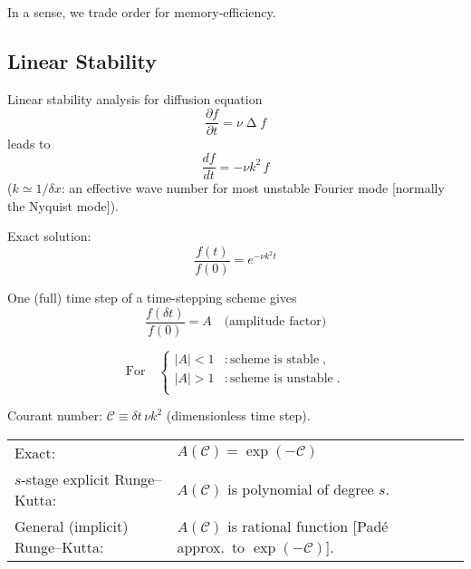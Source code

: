 \documentclass[\mydriver,12pt,twoside,notitlepage]{article}
\newcommand{\Black}{\color{black}}
\newcommand{\ColEmph}[1]{{\color{DarkishRed}#1}}
\newcommand{\colEmph}[1]{{\color{DarkishBlue}#1}}
\newcommand{\Courant} {\mathcal{C}}
\newcommand{\Laplace} { \mathop{\Delta}\nolimits}
\begin{document}
\bigskip

In a sense, we trade order for memory-efficiency.

\subsection{Linear Stability}

\ColEmph{Linear stability analysis} for \colEmph{diffusion equation}
\begin{equation}
  \dfrac{\partial f}{\partial t}
  = \nu \Laplace f
\end{equation}
leads to
\begin{equation}
  \dfrac{df}{dt} = - \nu k^2 \,f
\end{equation}
($k \simeq 1/\delta x$: an effective wave number for most
unstable Fourier mode [normally the Nyquist mode]).

Exact solution:
\begin{equation}
  \dfrac{f(t)}{f(0)} = e^{-\nu k^2 t}
\end{equation}

One (full) time step of a time-stepping scheme gives
\begin{equation}
  \dfrac{f(\delta t)}{f(0)} = A
  \quad\text{(amplitude factor)}
\end{equation}

\begin{equation*}
  \text{For} \quad
  \begin{cases}
    |A| < 1 &: \text{scheme is stable} \; , \\
    |A| > 1 &: \text{scheme is unstable} \; . \\
  \end{cases}
\end{equation*}

\clearpage

Courant number: $\Courant \equiv \delta t \, \nu k^2$ (dimensionless time step). 

\bigskip

\begin{tabular}{@{}ll}
  \Black
  Exact:                           & $A(\Courant) = \exp(-\Courant)$\\[1.5ex]
  \Black
  $s$-stage explicit Runge--Kutta: & $A(\Courant)$ is polynomial of degree
                                     $s$.\\[1.5ex]
  \Black
  General (implicit) Runge--Kutta: & $A(\Courant)$ is rational function
                                     [Padé approx.\ to $\exp(-\Courant)$].
\end{tabular}
\end{document}
